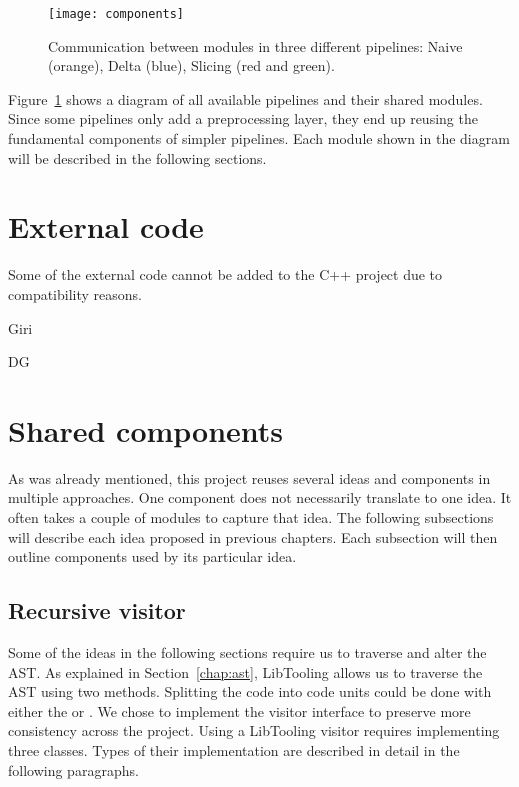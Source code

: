 \begin{figure}[h]\centering
\texttt{[image: components]}
\caption{Communication between modules in three different pipelines:
Naive (orange), Delta (blue), Slicing (red and green).}
\label{img:components}
\end{figure}

Figure~\ref{img:components} shows a diagram of all available pipelines and 
their shared modules. 
Since some pipelines only add a preprocessing layer, they end up reusing 
the fundamental components of simpler pipelines.
Each module shown in the diagram will be described in the following sections.

\section{External code}

Some of the external code cannot be added to the C++ project due to 
compatibility reasons.

Giri

DG

\section{Shared components}

As was already mentioned, this project reuses several ideas and components 
in multiple approaches. 
One component does not necessarily translate to one idea. 
It often takes a couple of modules to capture that idea. 
The following subsections will describe each idea proposed in previous 
chapters. 
Each subsection will then outline components used by its particular idea.

\subsection*{Recursive visitor}

Some of the ideas in the following sections require us to traverse and alter 
the AST.
As explained in Section~\ref{chap:ast}, LibTooling allows us to traverse 
the AST using two methods. 
Splitting the code into code units could be done with either 
the  or . 
We chose to implement the visitor interface to preserve more consistency 
across the project. 
Using a LibTooling visitor requires implementing three classes. 
Types of their implementation are described in detail in the following 
paragraphs.

